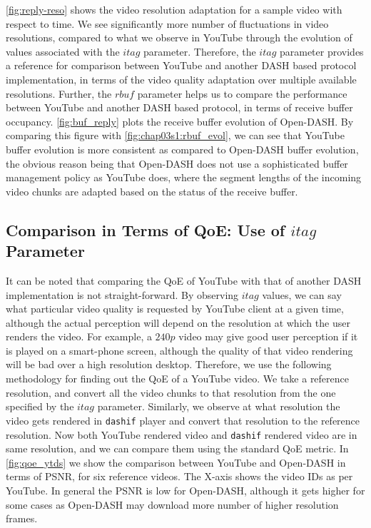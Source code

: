 \fig\ref{fig:reply-reso} shows the video resolution adaptation for a sample video with respect to time. We see significantly more number of fluctuations in video resolutions, compared to what we observe in YouTube through the evolution of values associated with the $itag$ parameter. Therefore, the $itag$ parameter provides a reference for comparison between YouTube and another DASH based protocol implementation, in terms of the video quality adaptation over multiple available resolutions. Further, the $rbuf$ parameter helps us to compare the performance between YouTube and another DASH based protocol, in terms of receive buffer occupancy. \fig\ref{fig:buf_reply} plots the receive buffer evolution of Open-DASH. By comparing this figure with \fig\ref{fig:chap03s1:rbuf_evol}, we can see that YouTube buffer evolution is more consistent as compared to Open-DASH buffer evolution, the obvious reason being that Open-DASH does not use a sophisticated buffer management policy as YouTube does, where the segment lengths of the incoming video chunks are adapted based on the status of the receive buffer.

% 
% 
\subsection{Comparison in Terms of QoE: Use of $itag$ Parameter}

It can be noted that comparing the QoE of YouTube with that of another DASH implementation is not straight-forward. By observing $itag$ values, we can say what particular video quality is requested by YouTube client at a given time, although the actual perception will depend on the resolution at which the user renders the video. For example, a $240p$ video may give good user perception if it is played on a smart-phone screen, although the quality of that video rendering will be bad over a high resolution desktop. Therefore, we use the following methodology for finding out the QoE of a YouTube video. We take a reference resolution, and convert all the video chunks to that resolution from the one specified by the $itag$ parameter. Similarly, we observe at what resolution the video gets rendered in \texttt{dashif} player and convert that resolution to the reference resolution. Now both YouTube rendered video and \texttt{dashif} rendered video are in same resolution, and we can compare them using the standard QoE metric. In \fig\ref{fig:qoe_ytds} we show the comparison between YouTube and Open-DASH in terms of PSNR, for six reference videos. The X-axis shows the video IDs as per YouTube. In general the PSNR is low for Open-DASH, although it gets higher for some cases as Open-DASH may download more number of higher resolution frames. 

